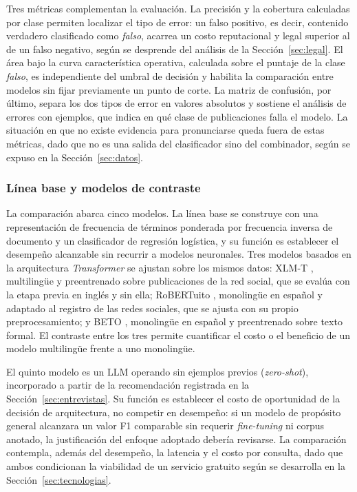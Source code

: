 Tres métricas complementan la evaluación. La precisión y la cobertura calculadas por clase permiten localizar el tipo de error: un falso positivo, es decir, contenido verdadero clasificado como \textit{falso}, acarrea un costo reputacional y legal superior al de un falso negativo, según se desprende del análisis de la Sección~\ref{sec:legal}. El área bajo la curva característica operativa, calculada sobre el puntaje de la clase \textit{falso}, es independiente del umbral de decisión y habilita la comparación entre modelos sin fijar previamente un punto de corte. La matriz de confusión, por último, separa los dos tipos de error en valores absolutos y sostiene el análisis de errores con ejemplos, que indica en qué clase de publicaciones falla el modelo. La situación en que no existe evidencia para pronunciarse queda fuera de estas métricas, dado que no es una salida del clasificador sino del combinador, según se expuso en la Sección~\ref{sec:datos}.

\subsubsection{Línea base y modelos de contraste}

La comparación abarca cinco modelos. La línea base se construye con una representación de frecuencia de términos ponderada por frecuencia inversa de documento y un clasificador de regresión logística, y su función es establecer el desempeño alcanzable sin recurrir a modelos neuronales. Tres modelos basados en la arquitectura \textit{Transformer} se ajustan sobre los mismos datos: XLM-T \parencite{BarbieriEtAl2022}, multilingüe y preentrenado sobre publicaciones de la red social, que se evalúa con la etapa previa en inglés y sin ella; RoBERTuito \parencite{PerezEtAl2022}, monolingüe en español y adaptado al registro de las redes sociales, que se ajusta con su propio preprocesamiento; y BETO \parencite{CañeteEtAl2020}, monolingüe en español y preentrenado sobre texto formal. El contraste entre los tres permite cuantificar el costo o el beneficio de un modelo multilingüe frente a uno monolingüe.

El quinto modelo es un LLM operando sin ejemplos previos (\textit{zero-shot}), incorporado a partir de la recomendación registrada en la Sección~\ref{sec:entrevistas}. Su función es establecer el costo de oportunidad de la decisión de arquitectura, no competir en desempeño: si un modelo de propósito general alcanzara un valor F1 comparable sin requerir \textit{fine-tuning} ni corpus anotado, la justificación del enfoque adoptado debería revisarse. La comparación contempla, además del desempeño, la latencia y el costo por consulta, dado que ambos condicionan la viabilidad de un servicio gratuito según se desarrolla en la Sección~\ref{sec:tecnologias}.

